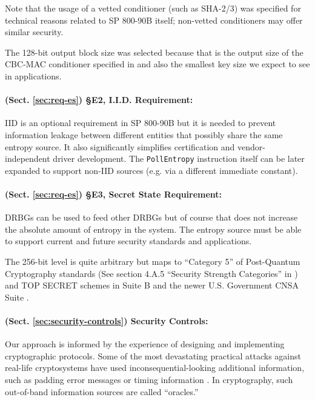     Note that the usage of a vetted conditioner (such as SHA-2/3) was
    specified for technical reasons related to SP 800-90B itself;
    non-vetted conditioners may offer similar security.

    The 128-bit output block size was selected because that is the output
    size of the CBC-MAC conditioner specified in \cite{TuBaKe+18} and also
    the smallest key size we expect to see in applications.

    \paragraph{(Sect. \ref{sec:req-es}) \S E2, I.I.D. Requirement:}
    IID is an optional requirement in SP 800-90B \cite{TuBaKe+18} but it
    is needed to prevent information leakage between different entities that
    possibly share the same entropy source. It also significantly
    simplifies certification and vendor-independent driver development.
    The \verb|PollEntropy| instruction itself can be later expanded
    to support non-IID sources (e.g. via a different immediate constant).

    \paragraph{(Sect. \ref{sec:req-es}) \S E3, Secret State Requirement:}
    DRBGs can be used to feed other DRBGs but of course that does not
    increase the absolute amount of entropy in the system.
    The entropy source must be able to support current and future security
    standards and applications.

    The 256-bit level is quite arbitrary but maps to
    ``Category 5'' of Post-Quantum Cryptography standards (See section 4.A.5
    ``Security Strength Categories'' in \cite{NI16}) and TOP SECRET schemes
    in Suite B and the newer U.S. Government CNSA Suite \cite{NS15}.

    \paragraph{(Sect. \ref{sec:security-controls}) Security Controls:}
    Our approach is informed by the experience of designing and implementing
    cryptographic protocols. Some of the most devastating practical attacks
    against real-life cryptosystems have used inconsequential-looking
    additional information, such as padding error messages \cite{BaFoKa+12}
    or timing information \cite{MoSuEi+20}. In cryptography, such
    out-of-band information sources  are called ``oracles.''

